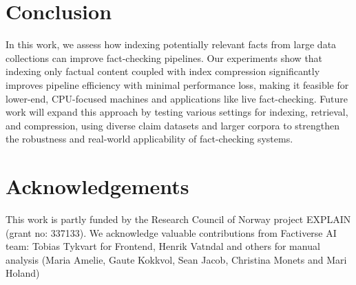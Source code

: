 \vspace{0.5cm}
\section{Conclusion}
\label{conclusion}
In this work, we assess how indexing potentially relevant facts from large data collections can improve fact-checking pipelines. Our experiments show that indexing only factual content coupled with index compression significantly improves pipeline efficiency with minimal performance loss, making it feasible for lower-end, CPU-focused machines and applications like live fact-checking. Future work will expand this approach by testing various settings for indexing, retrieval, and compression, using diverse claim datasets and larger corpora to strengthen the robustness and real-world applicability of fact-checking systems.
\section{Acknowledgements}
This work is partly funded by the Research Council of Norway project EXPLAIN (grant no:
337133). We acknowledge valuable
contributions from Factiverse AI team: Tobias Tykvart for Frontend, Henrik Vatndal  and
others for manual analysis (Maria Amelie,
Gaute Kokkvol, Sean Jacob, Christina Monets and
Mari Holand)

